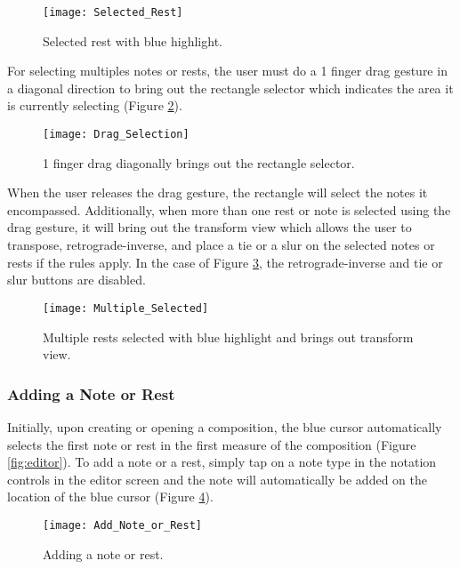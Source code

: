 \begin{figure}[H]
	\centering
	\texttt{[image: Selected\_Rest]}
    \caption{Selected rest with blue highlight.}
    \label{fig:selected-rest}
\end{figure}

For selecting multiples notes or rests, the user must do a 1 finger drag gesture in a diagonal direction to bring out the rectangle selector which indicates the area it is currently selecting (Figure \ref{fig:drag-selection}).

\begin{figure}[H]
	\centering
	\texttt{[image: Drag\_Selection]}
    \caption{1 finger drag diagonally brings out the rectangle selector.}
    \label{fig:drag-selection}
\end{figure}

When the user releases the drag gesture, the rectangle will select the notes it encompassed. Additionally, when more than one rest or note is selected using the drag gesture, it will bring out the transform view which allows the user to transpose, retrograde-inverse, and place a tie or a slur on the selected notes or rests if the rules apply. In the case of Figure \ref{fig:multiple-selected}, the retrograde-inverse and tie or slur buttons are disabled.

\begin{figure}[H]
	\centering
	\texttt{[image: Multiple\_Selected]}
    \caption{Multiple rests selected with blue highlight and brings out transform view.}
    \label{fig:multiple-selected}
\end{figure}

\subsubsection{Adding a Note or Rest}
Initially, upon creating or opening a composition, the blue cursor automatically selects the first note or rest in the first measure of the composition (Figure \ref{fig:editor}). To add a note or a rest, simply tap on a note type in the notation controls in the editor screen and the note will automatically be added on the location of the blue cursor (Figure \ref{fig:add-note-rest}).

\begin{figure}[H]
	\centering
	\texttt{[image: Add\_Note\_or\_Rest]}
    \caption{Adding a note or rest.}
    \label{fig:add-note-rest}
\end{figure}

